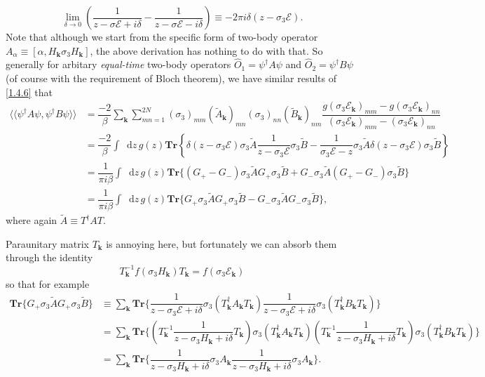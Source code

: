 \documentclass[10pt,nofootinbib]{revtex4}
\newcommand*\dd{\mathop{}\!\mathrm{d}}
\newcounter{Note}[section]
\begin{document}
		\begin{equation*}
			\lim_{\delta\rightarrow0}\left(\dfrac{1}{z-\sigma\mathscr{E}+i\delta}-\dfrac{1}{z-\sigma\mathscr{E}-i\delta}\right)\equiv-2\pi i\delta(z-\sigma_3\mathscr{E}).
		\end{equation*}
		\indent Note that although we start from the specific form of two-body operator $A_\alpha\equiv[\alpha,H_{\bm{k}}\sigma_3 H_{\bm{k}}]$, the above derivation has nothing to do with that. So generally for arbitary \emph{equal-time} two-body operators $\hat{O}_1=\psi^\dagger A\psi$ and $\hat{O}_2=\psi^\dagger B\psi$ (of course with the requirement of Bloch theorem), we have similar results of \eqref{1.4.6} that
		\begin{align}\label{1.4.7}
			\langle \langle \psi^\dagger A\psi,\psi^\dagger B\psi\rangle\rangle&=\dfrac{-2}{\beta}\sum_{\bm{k}}\sum_{mn=1}^{2N}(\sigma_3)_{mm}(\widetilde{A} _{\bm{k}})_{mn}(\sigma_3)_{nn}(\widetilde{B} _{\bm{k}})_{nm}\dfrac{g(\sigma_3\mathscr{E}_{\bm{k}})_{mm}-g(\sigma_3\mathscr{E}_{\bm{k}})_{nn}}{(\sigma_3\mathscr{E}_{\bm{k}})_{mm}-(\sigma_3\mathscr{E}_{\bm{k}})_{nn}}\nonumber\\
			&=\dfrac{-2}{\beta}\int\dd z\,g(z)\mathbf{Tr}\left\{\delta(z-\sigma_3\mathscr{E})\sigma_3 \widetilde{A}\dfrac{1}{z-\sigma_3\mathscr{E}}\sigma_3 \widetilde{B}-\dfrac{1}{\sigma_3\mathscr{E}-z}\sigma_3 \widetilde{A}\delta(z-\sigma_3\mathscr{E})\sigma_3 \widetilde{B}\right\}\nonumber\\
			&=\dfrac{1}{\pi i\beta}\int\dd z\,g(z)\mathbf{Tr}\bigg\{(G_+-G_-)\sigma_3 \widetilde{A}G_+\sigma_3 \widetilde{B} + G_-\sigma_3 \widetilde{A}(G_+-G_-)\sigma_3 \widetilde{B}\bigg\}\nonumber\\
			&=\dfrac{1}{\pi i\beta}\int\dd z\,g(z)\mathbf{Tr}\bigg\{G_+\sigma_3\widetilde{A}G_+\sigma_3\widetilde{B}-G_-\sigma_3\widetilde{A}G_-\sigma_3\widetilde{B}\bigg\},
		\end{align}
		where again $\widetilde{A}\equiv T^\dagger A T$.\par
		Paraunitary matrix $T_{\bm{k}}$ is annoying here, but fortunately we can absorb them through the identity
		\begin{equation}\label{1.4.8}
			T^{-1}_{\bm{k}}f(\sigma_3 H_{\bm{k}})T_{\bm{k}}=f(\sigma_3\mathscr{E}_{\bm{k}})
		\end{equation}
		so that for example
		\begin{align*}
			\mathbf{Tr}\bigg\{G_+\sigma_3\widetilde{A}G_+\sigma_3\widetilde{B}\bigg\}&\equiv\sum_{\bm{k}}\mathbf{Tr}\bigg\{\dfrac{1}{z-\sigma_3\mathscr{E}+i\delta}\sigma_3(T_{\bm{k}}^\dagger A_{\bm{k}}T_{\bm{k}})\dfrac{1}{z-\sigma_3\mathscr{E}+i\delta}\sigma_3(T_{\bm{k}}^\dagger B_{\bm{k}}T_{\bm{k}})\bigg\}\\
			&=\sum_{\bm{k}}\mathbf{Tr}\bigg\{\left(T_{\bm{k}}^{-1}\dfrac{1}{z-\sigma_3H_{\bm{k}}+i\delta}T_{\bm{k}}\right)\sigma_3(T_{\bm{k}}^\dagger A_{\bm{k}}T_{\bm{k}})\left(T_{\bm{k}}^{-1}\dfrac{1}{z-\sigma_3H_{\bm{k}}+i\delta}T_{\bm{k}}\right)\sigma_3(T_{\bm{k}}^\dagger B_{\bm{k}}T_{\bm{k}})\bigg\}\\
			&=\sum_{\bm{k}}\mathbf{Tr}\bigg\{\dfrac{1}{z-\sigma_3 H_{\bm{k}}+i\delta}\sigma_3 A_{\bm{k}}\dfrac{1}{z-\sigma_3H_{\bm{k}}+i\delta}\sigma_3 A_{\bm{k}}\bigg\}.
		\end{align*}
\end{document}
